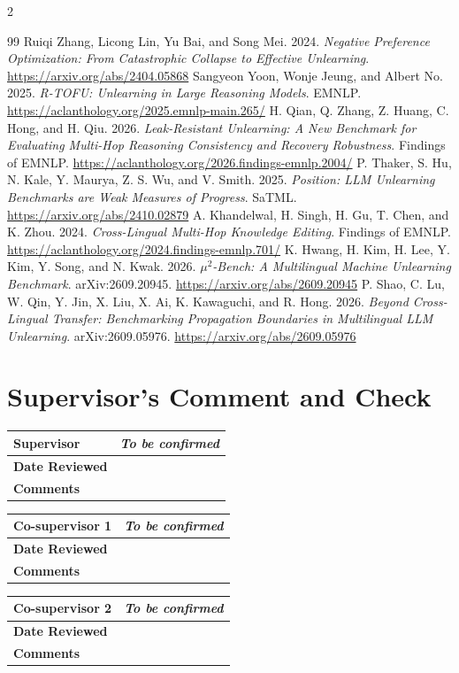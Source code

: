 \documentclass[10pt,a4paper]{article}
\newcommand{\supervisor}{\textit{To be confirmed}}
\newcommand{\cosupervisora}{\textit{To be confirmed}}
\newcommand{\cosupervisorb}{\textit{To be confirmed}}
\newcommand{\guide}[1]{} %
\begin{document}
{\begin{multicols}{2}
\begin{thebibliography}{99}
 Ruiqi Zhang, Licong Lin, Yu Bai, and Song Mei. 2024. \emph{Negative Preference Optimization: From Catastrophic Collapse to Effective Unlearning}. \url{https://arxiv.org/abs/2404.05868}
 Sangyeon Yoon, Wonje Jeung, and Albert No. 2025. \emph{R-TOFU: Unlearning in Large Reasoning Models}. EMNLP. \url{https://aclanthology.org/2025.emnlp-main.265/}
 H. Qian, Q. Zhang, Z. Huang, C. Hong, and H. Qiu. 2026. \emph{Leak-Resistant Unlearning: A New Benchmark for Evaluating Multi-Hop Reasoning Consistency and Recovery Robustness}. Findings of EMNLP. \url{https://aclanthology.org/2026.findings-emnlp.2004/}
 P. Thaker, S. Hu, N. Kale, Y. Maurya, Z. S. Wu, and V. Smith. 2025. \emph{Position: LLM Unlearning Benchmarks are Weak Measures of Progress}. SaTML. \url{https://arxiv.org/abs/2410.02879}
 A. Khandelwal, H. Singh, H. Gu, T. Chen, and K. Zhou. 2024. \emph{Cross-Lingual Multi-Hop Knowledge Editing}. Findings of EMNLP. \url{https://aclanthology.org/2024.findings-emnlp.701/}
 K. Hwang, H. Kim, H. Lee, Y. Kim, Y. Song, and N. Kwak. 2026. \emph{$\mu^2$-Bench: A Multilingual Machine Unlearning Benchmark}. arXiv:2609.20945. \url{https://arxiv.org/abs/2609.20945}
 P. Shao, C. Lu, W. Qin, Y. Jin, X. Liu, X. Ai, K. Kawaguchi, and R. Hong. 2026. \emph{Beyond Cross-Lingual Transfer: Benchmarking Propagation Boundaries in Multilingual LLM Unlearning}. arXiv:2609.05976. \url{https://arxiv.org/abs/2609.05976}
\end{thebibliography}\end{multicols}}

\newcommand{\reviewerblock}[2]{%
  \needspace{8\baselineskip}%
  \begin{tabularx}{\textwidth}{|p{4cm}|X|}\hline
  \textbf{#2} & #1\\ \hline
  \textbf{Date Reviewed} & \\ \hline
  \textbf{Comments} & \rule[-3.6cm]{0pt}{3.7cm}\\ \hline
  \end{tabularx}\par\medskip}

\clearpage
\section*{\color{fsds}Supervisor's Comment and Check}
\guide{For supervisors only; the researcher leaves this page untouched. Each reviewer fills in their own block: date reviewed and comments.}

\reviewerblock{\supervisor}{Supervisor}
\reviewerblock{\cosupervisora}{Co-supervisor 1}
\reviewerblock{\cosupervisorb}{Co-supervisor 2}
\end{document}
